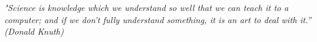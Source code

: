 \begin{epigrafe}
    \vspace*{\fill}
	\begin{flushright}
	\textit{"Science is knowledge which we understand so well that we can teach it to a computer; and if we don't fully understand something, it is an art to deal with it.''\\
		(Donald Knuth)}
	\end{flushright}
\end{epigrafe}
\newpage